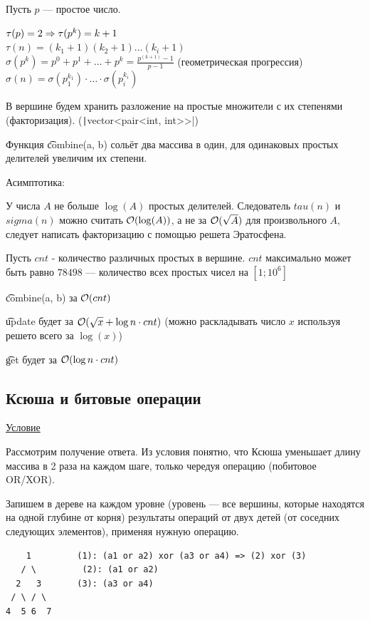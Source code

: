 Пусть $p$ --- простое число.

$\tau(p) = 2 \Rightarrow \tau(p^k) = k + 1$ \\
$\tau(n) = (k_1+1) (k_2+1) \ldots (k_i+1)$ \\
$\sigma(p ^ k) = p^0 + p^1 + \ldots + p^k = \frac{p^(k + 1) - 1}{p - 1}$ (геометрическая прогрессия) \\
$\sigma(n) = \sigma(p_1^{k_1}) \cdot \ldots \cdot \sigma(p_i^{k_i})$

\down

В вершине будем хранить разложение на простые множители с их степенями (факторизация). (\texttt|vector<pair<int, int>>|)

Функция \t{combine(a, b)} сольёт два массива в один, для одинаковых простых делителей увеличим их степени.

Асимптотика:

У числа $A$ не больше $\log(A)$ простых делителей. Следователь $tau(n)$ и $sigma(n)$ можно считать $\mathcal{O}(\log(A))$, а не за $\mathcal{O}(\sqrt A)$ для произвольного $A$, следует написать факторизацию с помощью решета Эратосфена.

Пусть $cnt$ - количество различных простых в вершине. $cnt$ максимально может быть равно $78498$ --- количество всех простых чисел на $[1; 10^6]$

\t{combine(a, b)} за $\mathcal{O}(cnt)$

\t{update} будет за $\mathcal{O}(\sqrt x + \log n \cdot cnt)$ (можно раскладывать число $x$ используя решето всего за $\log(x)$)

\t{get} будет за $\mathcal{O}(\log n \cdot cnt)$

\subsection{Ксюша и битовые операции}

\href{https://codeforces.com/contest/339/problem/D}{Условие} \href{https://codeforces.com/contest/339/submission/105829607}{}

Рассмотрим получение ответа. Из условия понятно, что Ксюша уменьшает длину массива в 2 раза на каждом шаге, только чередуя операцию (побитовое OR/XOR). 

Запишем в дереве на каждом уровне (уровень --- все вершины, которые находятся на одной глубине от корня) результаты операций от двух детей (от соседних следующих элементов), применяя нужную операцию.

\begin{verbatim}
    1         (1): (a1 or a2) xor (a3 or a4) => (2) xor (3)
   / \	       (2): (a1 or a2) 
  2   3       (3): (a3 or a4)
 / \ / \
4  5 6  7      
\end{verbatim}

